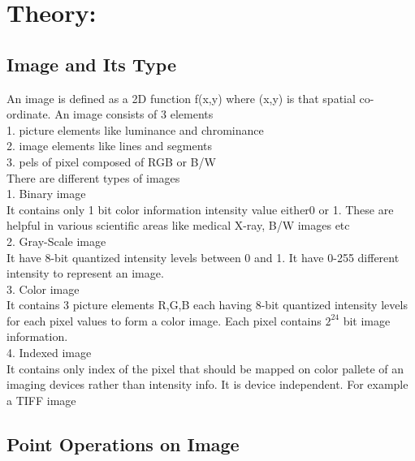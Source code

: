 \documentclass[12pt]{article}
\begin{document}

\tableofcontents
\pagebreak


\section{Theory:}
\subsection{Image and Its Type}
An image is defined as a 2D function f(x,y) where (x,y) is that spatial co-ordinate. An image consists of 3 elements\\
1. picture elements like luminance and chrominance\\
2. image elements like lines and segments\\
3. pels of pixel composed of RGB or B/W\\

There are different types of images\\
1. Binary image\\
It contains only 1 bit color information intensity value either0 or 1. These are helpful in various scientific areas like medical X-ray, B/W images etc\\

2. Gray-Scale image\\
It have 8-bit quantized intensity levels between 0 and 1. It have 0-255 different intensity to represent an image.\\

3. Color image\\
It contains 3 picture elements R,G,B each having 8-bit quantized intensity levels for each pixel values to form a color image. Each pixel contains $2^{24}$ bit image information.\\

4. Indexed image\\
It contains only index of the pixel that should be mapped on color pallete of an imaging devices rather than intensity info. It is device independent. For example a TIFF image


\subsection{Point Operations on Image}
\end{document}
